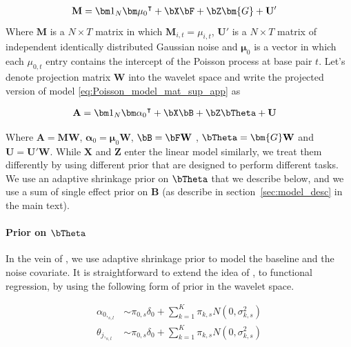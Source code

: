  
 
 \begin{align}  \label{eq:Poisson_model_mat_sup_app}
   \mathbf{  M }  &= {\bm 1}_N {\bm\mu_0}^{\intercal} +    \bX\bF + \bZ\bm{G} +\mathbf{ U}' 
 \end{align}
 Where $ \mathbf{  M } $ is a $N\times T$ matrix in which  $ \mathbf{  M } _{i,t} = \mu_{i,t}$, $\mathbf{U}'$ is a $N \times T$ matrix of independent identically distributed Gaussian noise and $ \bm\mu_0 $ is a vector in which each $\mu_{0,t}$ entry contains the intercept of the Poisson process at base pair $t$.   Let's denote projection matrix $\mathbf{W}$ into the wavelet space and write the projected version of model \ref{eq:Poisson_model_mat_sup_app} as
 
 
 \begin{align} \label{eq:Poisson_model_mat_sup_app_proj} 
   \mathbf{  A }  &= {\bm 1}_N {\bm\alpha_0}^{\intercal} +    \bX\bB + \bZ\bTheta +\mathbf{ U} 
 \end{align}

 Where $\mathbf{  A }=  \mathbf{  M } \mathbf{W} $,  $\bm\alpha_0= \bm\mu_0 \mathbf{W}  $, $\bB= \bF\mathbf{W}$ ,  $\bTheta= \bm{G}\mathbf{W}$  and $\mathbf{ U} =\mathbf{U}' \mathbf{ W}   $. While $\bm{X}$ and $\bm{Z}$ enter the linear model similarly, we treat them differently by using different prior that are designed to perform different tasks. We use an adaptive shrinkage prior on  $\bTheta$ that we describe below, and we use a sum of single effect prior on $\bm{B}$ (as describe in section~\ref{sec:model_desc} in the main text).
 
\paragraph{Prior on $\bTheta$ }
In the vein of   \cite{kim_flexible_2022}, we use adaptive shrinkage prior \citep{stephens_false_2017} to model the baseline and the noise covariate. It is straightforward to extend the idea of \cite{kim_flexible_2022}, to functional regression, by using  the following form of prior in the wavelet space.

\begin{align}  
 \alpha_{0,_{s,l}} &\sim  \pi_{0,s}\delta_0 +\sum_{k=1}^K \pi_{k,s} N(0,\sigma_{k,s }^2) \label{eq:mrash1}\\
 \theta_{j,_{s,l}} &\sim  \pi_{0,s}\delta_0 +\sum_{k=1}^K \pi_{k,s} N(0,\sigma_{k,s }^2)  \label{eq:mrash2}
\end{align}


